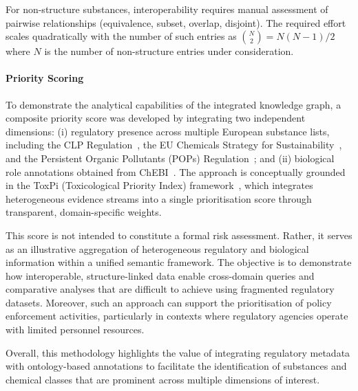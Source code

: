 For non-structure substances, interoperability requires manual assessment of
pairwise relationships (equivalence, subset, overlap, disjoint). The required
effort scales quadratically with the number of such entries as $\binom{N}{2} = N(N-1)/2$ where $N$ is the number of non-structure entries under consideration.

\paragraph{Priority Scoring}
\label{sec:priority_score}

To demonstrate the analytical capabilities of the integrated knowledge graph, a composite priority score was developed by integrating two independent dimensions: (i) regulatory presence across multiple European substance lists, including the CLP Regulation~\cite{CLP2008}, the EU Chemicals Strategy for Sustainability~\cite{EUCSS2020}, and the Persistent Organic Pollutants (POPs) Regulation~\cite{POPs2019}; and (ii) biological role annotations obtained from ChEBI~\cite{Degtyarenko2008}. The approach is conceptually grounded in the ToxPi (Toxicological Priority Index) framework~\cite{Reif2010}, which integrates heterogeneous evidence streams into a single prioritisation
score through transparent, domain-specific weights. 

This score is not intended to constitute a formal risk assessment. Rather, it serves as an illustrative aggregation of heterogeneous regulatory and biological information within a unified semantic framework. The objective is to demonstrate how interoperable, structure-linked data enable cross-domain queries and comparative analyses that are difficult to achieve using fragmented regulatory datasets. Moreover, such an approach can support the prioritisation of policy enforcement activities, particularly in contexts where regulatory agencies operate with limited personnel resources.

Overall, this methodology highlights the value of integrating regulatory metadata with ontology-based annotations to facilitate the identification of substances and chemical classes that are prominent across multiple dimensions of interest.